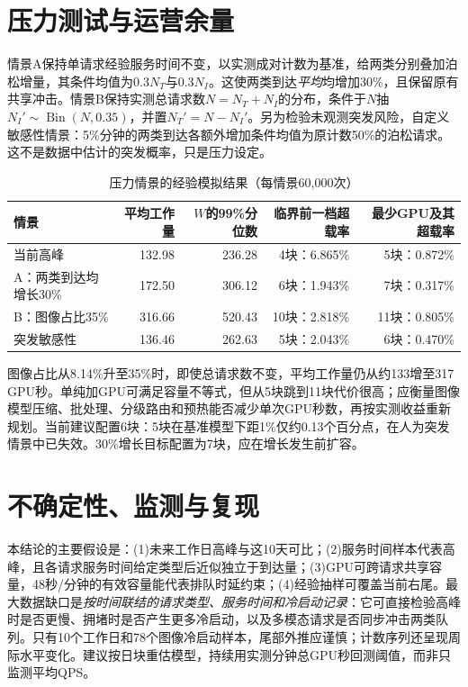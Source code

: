 \documentclass[UTF8,a4paper,11pt,fontset=fandol]{ctexart}
\numberwithin{equation}{section}
\begin{document}
\section{压力测试与运营余量}
情景A保持单请求经验服务时间不变，以实测成对计数为基准，给两类分别叠加泊松增量，其条件均值为$0.3N_T$与$0.3N_I$。这使两类到达\emph{平均}均增加30\%，且保留原有共享冲击。情景B保持实测总请求数$N=N_T+N_I$的分布，条件于$N$抽$N_I'\sim\operatorname{Bin}(N,0.35)$，并置$N_T'=N-N_I'$。另为检验未观测突发风险，自定义敏感性情景：5\%分钟的两类到达各额外增加条件均值为原计数50\%的泊松请求。这不是数据中估计的突发概率，只是压力设定。

\begin{table}[htbp]\centering
\small\setlength{\tabcolsep}{4pt}
\caption{压力情景的经验模拟结果（每情景60,000次）}
\begin{tabular}{lrrrr}\toprule
情景&平均工作量&$W$的99\%分位数&临界前一档超载率&最少GPU及其超载率\\\midrule
当前高峰&132.98&236.28&4块：6.865\%&5块：0.872\%\\
A：两类到达均增长30\%&172.50&306.12&6块：1.943\%&7块：0.317\%\\
B：图像占比35\%&316.66&520.43&10块：2.818\%&11块：0.805\%\\
突发敏感性&136.46&262.63&5块：2.043\%&6块：0.470\%\\\bottomrule
\end{tabular}
\label{tab:stress}
\end{table}

图像占比从8.14\%升至35\%时，即使总请求数不变，平均工作量仍从约133增至317 GPU秒。单纯加GPU可满足容量不等式，但从5块跳到11块代价很高；应衡量图像模型压缩、批处理、分级路由和预热能否减少单次GPU秒数，再按实测收益重新规划。当前建议配置6块：5块在基准模型下距1\%仅约0.13个百分点，在人为突发情景中已失效。30\%增长目标配置为7块，应在增长发生前扩容。

\section{不确定性、监测与复现}
本结论的主要假设是：(1)未来工作日高峰与这10天可比；(2)服务时间样本代表高峰，且各请求服务时间给定类型后近似独立于到达量；(3)GPU可跨请求共享容量，48秒/分钟的有效容量能代表排队时延约束；(4)经验抽样可覆盖当前右尾。最大数据缺口是\emph{按时间联结的请求类型、服务时间和冷启动记录}：它可直接检验高峰时是否更慢、拥堵时是否产生更多冷启动，以及多模态请求是否同步冲击两类队列。只有10个工作日和78个图像冷启动样本，尾部外推应谨慎；计数序列还呈现周际水平变化。建议按日块重估模型，持续用实测分钟总GPU秒回测阈值，而非只监测平均QPS。
\end{document}
